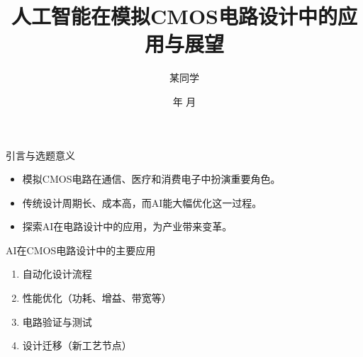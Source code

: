 \documentclass[xcolor=table,dvipsnames,svgnames,aspectratio=169]{ctexbeamer}
\author{某同学}
\institute[SUEP]{2021391}
\date{\the\year 年 \the\month 月}
\title[人工智能在模拟CMOS电路设计中的应用与展望] %
{\textbf{人工智能在模拟CMOS电路设计中的应用与展望}} %
\begin{document}
\AtBeginSection[]{
  \begin{frame}
    \tableofcontents[currentsection,subsectionstyle=show/show/hide]
  \end{frame}
}

\AtBeginSubsection[]{		       %
  \begin{frame}
    \tableofcontents[currentsection,subsectionstyle=show/shaded/hide]
  \end{frame}
}

\maketitle


\begin{frame}{引言与选题意义}
  \begin{itemize}
      \item 模拟CMOS电路在通信、医疗和消费电子中扮演重要角色。
      \item 传统设计周期长、成本高，而AI能大幅优化这一过程。
      \item 探索AI在电路设计中的应用，为产业带来变革。
  \end{itemize}
  \begin{center}
  \end{center}
\end{frame}

\begin{frame}{AI在CMOS电路设计中的主要应用}
  \begin{enumerate}
      \item 自动化设计流程
      \item 性能优化（功耗、增益、带宽等）
      \item 电路验证与测试
      \item 设计迁移（新工艺节点）
  \end{enumerate}
  \begin{center}
  \end{center}
\end{frame}
\end{document}
